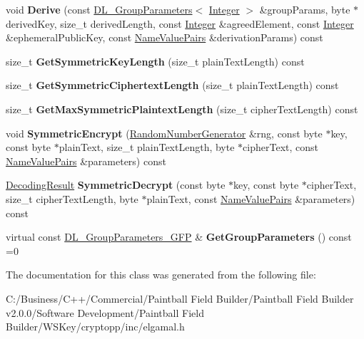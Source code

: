 \begin{DoxyCompactItemize}
\item 
\hypertarget{class_el_gamal_base_aaeac8cd47a26c15417fe6cb30af8ae0f}{
void {\bfseries Derive} (const \hyperlink{class_d_l___group_parameters}{DL\_\-GroupParameters}$<$ \hyperlink{class_integer}{Integer} $>$ \&groupParams, byte $\ast$derivedKey, size\_\-t derivedLength, const \hyperlink{class_integer}{Integer} \&agreedElement, const \hyperlink{class_integer}{Integer} \&ephemeralPublicKey, const \hyperlink{class_name_value_pairs}{NameValuePairs} \&derivationParams) const }
\label{class_el_gamal_base_aaeac8cd47a26c15417fe6cb30af8ae0f}

\item 
\hypertarget{class_el_gamal_base_a14ac7ac4ccb1d1bf5221e679ab24c28d}{
size\_\-t {\bfseries GetSymmetricKeyLength} (size\_\-t plainTextLength) const }
\label{class_el_gamal_base_a14ac7ac4ccb1d1bf5221e679ab24c28d}

\item 
\hypertarget{class_el_gamal_base_a8598d1ce1f20423ae10dd8ff80e2cfd3}{
size\_\-t {\bfseries GetSymmetricCiphertextLength} (size\_\-t plainTextLength) const }
\label{class_el_gamal_base_a8598d1ce1f20423ae10dd8ff80e2cfd3}

\item 
\hypertarget{class_el_gamal_base_acab5ed17e036c9be22d3c7db612cd51e}{
size\_\-t {\bfseries GetMaxSymmetricPlaintextLength} (size\_\-t cipherTextLength) const }
\label{class_el_gamal_base_acab5ed17e036c9be22d3c7db612cd51e}

\item 
\hypertarget{class_el_gamal_base_aa8bfe7f4e11f39c014699c755d0d8be6}{
void {\bfseries SymmetricEncrypt} (\hyperlink{class_random_number_generator}{RandomNumberGenerator} \&rng, const byte $\ast$key, const byte $\ast$plainText, size\_\-t plainTextLength, byte $\ast$cipherText, const \hyperlink{class_name_value_pairs}{NameValuePairs} \&parameters) const }
\label{class_el_gamal_base_aa8bfe7f4e11f39c014699c755d0d8be6}

\item 
\hypertarget{class_el_gamal_base_ab88d21d5c3d4e7400bf8083b271e2923}{
\hyperlink{struct_decoding_result}{DecodingResult} {\bfseries SymmetricDecrypt} (const byte $\ast$key, const byte $\ast$cipherText, size\_\-t cipherTextLength, byte $\ast$plainText, const \hyperlink{class_name_value_pairs}{NameValuePairs} \&parameters) const }
\label{class_el_gamal_base_ab88d21d5c3d4e7400bf8083b271e2923}

\item 
\hypertarget{class_el_gamal_base_a56116820aea0a94b992b214fcf65dfb2}{
virtual const \hyperlink{class_d_l___group_parameters___g_f_p}{DL\_\-GroupParameters\_\-GFP} \& {\bfseries GetGroupParameters} () const =0}
\label{class_el_gamal_base_a56116820aea0a94b992b214fcf65dfb2}

\end{DoxyCompactItemize}


The documentation for this class was generated from the following file:\begin{DoxyCompactItemize}
\item 
C:/Business/C++/Commercial/Paintball Field Builder/Paintball Field Builder v2.0.0/Software Development/Paintball Field Builder/WSKey/cryptopp/inc/elgamal.h\end{DoxyCompactItemize}
